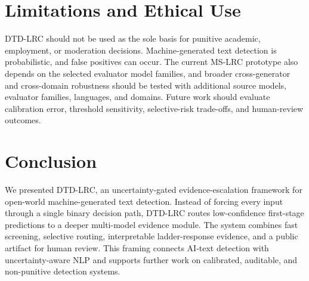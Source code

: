 \documentclass[11pt]{article}
\begin{document}
\section{Limitations and Ethical Use}

DTD-LRC should not be used as the sole basis for punitive academic, employment, or moderation decisions. Machine-generated text detection is probabilistic, and false positives can occur. The current MS-LRC prototype also depends on the selected evaluator model families, and broader cross-generator and cross-domain robustness should be tested with additional source models, evaluator families, languages, and domains. Future work should evaluate calibration error, threshold sensitivity, selective-risk trade-offs, and human-review outcomes.

\section{Conclusion}

We presented DTD-LRC, an uncertainty-gated evidence-escalation framework for open-world machine-generated text detection. Instead of forcing every input through a single binary decision path, DTD-LRC routes low-confidence first-stage predictions to a deeper multi-model evidence module. The system combines fast screening, selective routing, interpretable ladder-response evidence, and a public artifact for human review. This framing connects AI-text detection with uncertainty-aware NLP and supports further work on calibrated, auditable, and non-punitive detection systems.



\end{document}
